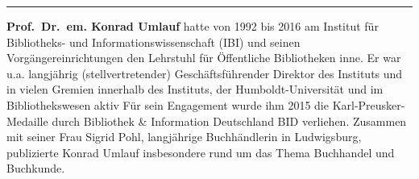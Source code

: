 \begin{center}\rule{0.5\linewidth}{\linethickness}\end{center}

\textbf{Prof.~Dr.~em. Konrad Umlauf} hatte von 1992 bis 2016 am Institut
für Bibliotheks- und Informationswissenschaft (IBI) und seinen
Vorgängereinrichtungen den Lehrstuhl für Öffentliche Bibliotheken inne.
Er war u.a. langjährig (stellvertretender) Geschäftsführender Direktor
des Instituts und in vielen Gremien innerhalb des Instituts, der
Humboldt-Universität und im Bibliothekswesen aktiv Für sein Engagement
wurde ihm 2015 die Karl-Preusker-Medaille durch Bibliothek \&
Information Deutschland BID verliehen. Zusammen mit seiner Frau Sigrid
Pohl, langjährige Buchhändlerin in Ludwigsburg, publizierte Konrad
Umlauf insbesondere rund um das Thema Buchhandel und Buchkunde.
